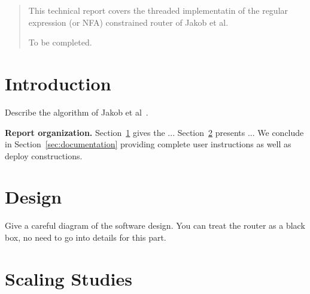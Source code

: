 \documentclass[english]{article}
\theoremstyle{remark}
\numberwithin{equation}{section}
\begin{document}
\begin{abstract}
This technical report covers the threaded implementatin of the regular
expression (or NFA) constrained router of Jakob et al.

To be completed.

\end{abstract}

\section*{Introduction}
\label{sec:introduction}

Describe the algorithm of Jakob et al~\cite{Barrett:00}.

\textbf{Report organization.} Section~\ref{sec:design} gives the
... Section~\ref{sec:scalingstudies} presents ... We conclude in
Section~\ref{sec:documentation} providing complete user instructions
as well as deploy constructions.

\section{Design}
\label{sec:design}

Give a careful diagram of the software design. You can treat the
router as a black box, no need to go into details for this part.


\section{Scaling Studies}
\label{sec:scalingstudies}
\end{document}

